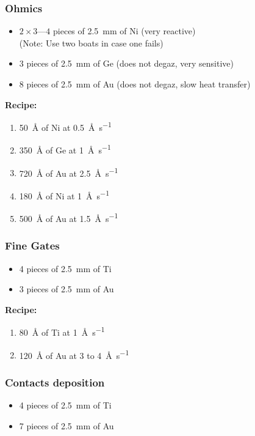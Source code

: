 \documentclass[12pt,a4paper]{report}
\begin{document}
\subsubsection{Ohmics}
\begin{itemize}
\item $2 \times 3\text{---}4$ pieces of \SI{2.5}{\milli\meter} of Ni (very reactive)\\
  (Note: Use two boats in case one fails)
\item 3 pieces of \SI{2.5}{\milli\meter} of Ge (does not degaz, very sensitive)
\item 8 pieces of \SI{2.5}{\milli\meter} of Au (does not degaz, slow heat transfer)
\end{itemize}

\textbf{Recipe: }
\begin{enumerate}[label=\protect\nth{\value*} layer: ,noitemsep,leftmargin=10em]
\item \SI{50}{\angstrom} of Ni at \SI{0.5}{\angstrom\per\second} 
\item \SI{350}{\angstrom} of Ge at \SI{1}{\angstrom\per\second} 
\item \SI{720}{\angstrom} of Au at \SI{2.5}{\angstrom\per\second} 
\item \SI{180}{\angstrom} of Ni at \SI{1}{\angstrom\per\second} 
\item \SI{500}{\angstrom} of Au at \SI{1.5}{\angstrom\per\second} 
\end{enumerate}

\subsubsection{Fine Gates}
\begin{itemize}
\item 4 pieces of \SI{2.5}{\milli\meter} of Ti
\item 3 pieces of \SI{2.5}{\milli\meter} of Au
\end{itemize}

\textbf{Recipe: }
\begin{enumerate}[label=\protect\nth{\value*} layer: ,noitemsep,leftmargin=10em]
\item \SI{80}{\angstrom} of Ti at \SI{1}{\angstrom\per\second}
\item \SI{120}{\angstrom} of Au at 3 to \SI{4}{\angstrom\per\second}
\end{enumerate}


\subsubsection{Contacts deposition}
\begin{itemize}
\item 4 pieces of \SI{2.5}{\milli\meter} of Ti
\item 7 pieces of \SI{2.5}{\milli\meter} of Au
\end{itemize}
\end{document}
